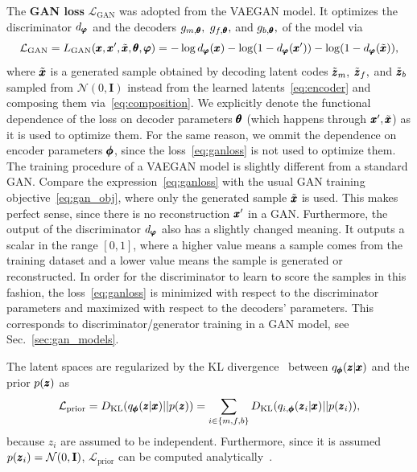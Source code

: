 The \textbf{GAN loss} $\mathcal{L}_{\text{GAN}}$ was adopted from the VAEGAN model. It optimizes the discriminator $d_{\pmb{{\varphi}}}$ and the decoders $g_{m,\pmb{{\theta}}},$ $g_{f,\pmb{{\theta}}},$ and $g_{b,\pmb{{\theta}}},$ of the model via
\begin{equation} \label{eq:ganloss}
    \mathcal{L}_{\text{GAN}} = L_{\text{GAN}}(\pmb{{x}}, \pmb{{x}}', \tilde{\pmb{{x}}}, \pmb{{\theta}}, \pmb{{\varphi}})  = - \log d_{\pmb{{\varphi}}}(\pmb{{x}}) - \log (1 - d_{\pmb{{\varphi}}}(\pmb{{x}}')) - \log (1-d_{\pmb{{\varphi}}}(\tilde{\pmb{{x}}})),
\end{equation}
where $\tilde{\pmb{{x}}}$ is a generated sample obtained by decoding latent codes $\tilde{\pmb{{z}}}_m,$ $\tilde{\pmb{{z}}}_f,$ and $\tilde{\pmb{{z}}}_b$ sampled from $\mathcal{N}(0,\textbf{I})$ instead from the learned latents~\eqref{eq:encoder} and composing them via~\eqref{eq:composition}. We explicitly denote the functional dependence of the loss on decoder parameters $\pmb{{\theta}}$ (which happens through $\pmb{{x}}', \tilde{\pmb{{x}}}$) as it is used to optimize them. For the same reason, we ommit the dependence on encoder parameters $\pmb{{\phi}}$, since the loss~\eqref{eq:ganloss} is not used to optimize them. The training procedure of a VAEGAN model is slightly different from a standard GAN. Compare the expression~\eqref{eq:ganloss} with the usual GAN training objective~\eqref{eq:gan_obj}, where only the generated sample $\tilde{\pmb{{x}}}$ is used. This makes perfect sense, since there is no reconstruction  $\pmb{{x}}'$ in a GAN. Furthermore, the output of the discriminator $d_{\pmb{{\varphi}}}$ also has a slightly changed meaning. It outputs a scalar in the range $[0,1]$, where a higher value means a sample comes from the training dataset and a lower value means the sample is generated or reconstructed. In order for the discriminator to learn to score the samples in this fashion, the loss~\eqref{eq:ganloss} is minimized with respect to the discriminator parameters and maximized with respect to the decoders' parameters. This corresponds to discriminator/generator training in a GAN model, see Sec.~\ref{sec:gan_models}.

The latent spaces are regularized by the KL divergence~\cite{kingma2013vae} between $q_{\pmb{{\phi}}} (\pmb{{z}} \vert \pmb{{x}})$ and the prior $p(\pmb{{z}})$ as
\begin{equation} \label{eq:kldloss}
    \mathcal{L}_{\text{prior}} = D_\text{KL} (q_{\pmb{{\phi}}} (\pmb{{z}} \vert \pmb{{x}}) \vert \vert p(\pmb{{z}})) = \sum_{i \in \lbrace m, f, b \rbrace} D_\text{KL} (q_{i,\pmb{{\phi}}} (\pmb{{z}}_i  \vert \pmb{{x}}) \vert\vert p(\pmb{{z}}_i)),
\end{equation} 
because $z_i$ are assumed to be independent. Furthermore, since it is assumed $p(\pmb{{z}}_i) = \mathcal{N}(0,\mathbf{I})$, $\mathcal{L}_{\text{prior}}$ can be computed analytically~\cite{kingma2013vae}.

